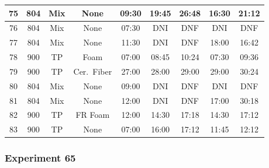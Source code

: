 \begin{table}[ht]
\begin{tabular}{|c|c|c|c|c|c|c|c|c|}
75     & 804     & Mix      & None             & 09:30     & 19:45      & 26:48            & 16:30      & 21:12            \\ \hline
76     & 804     & Mix      & None             & 07:30     & DNI        & DNF              & DNI        & DNF              \\ \hline
77     & 804     & Mix      & None             & 11:30     & DNI        & DNF              & 18:00      & 16:42            \\ \hline
78     & 900     & TP       & Foam             & 07:00     & 08:45      & 10:24            & 07:30      & 09:36            \\ \hline
79     & 900     & TP       & Cer.~Fiber       & 27:00     & 28:00      & 29:00            & 29:00      & 30:24            \\ \hline
80     & 804     & Mix      & None             & 09:00     & DNI        & DNF              & DNI        & DNF              \\ \hline
81     & 804     & Mix      & None             & 12:00     & DNI        & DNF              & 17:00      & 30:18            \\ \hline
82     & 900     & TP       & FR Foam          & 12:00     & 14:30      & 17:18            & 14:30      & 17:12            \\ \hline
83     & 900     & TP       & None             & 07:00     & 16:00      & 17:12            & 11:45      & 12:12            \\ \hline
\end{tabular}
\end{table}






\clearpage

\subsubsection{Experiment 65}


